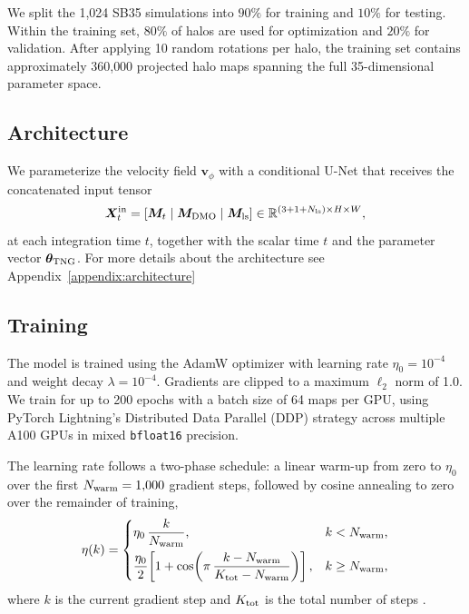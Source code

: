 \documentclass[linenumbers,trackchanges, twocolumn]{aastex701}
\begin{document}
We split the 1{,}024 SB35 simulations into $90\%$ for training and
$10\%$ for testing. Within the training set, $80\%$ of halos are used
for optimization and $20\%$ for validation. After applying 10 random
rotations per halo, the training set contains approximately
360{,}000 projected halo maps spanning the full 35-dimensional
parameter space.

\subsection{Architecture}
\label{subsec:architecture}

We parameterize the velocity field $\bm{v}_\phi$ with a conditional
U-Net \citep{ronneberger2015unet} that receives the concatenated input
tensor
\begin{equation}
    \bm{X}^{\rm in}_t
    = \left[\bm{M}_t \;\middle|\; \bm{M}_{\rm DMO}
             \;\middle|\; \bm{M}_{\rm ls}\right]
    \in \mathbb{R}^{(3+1+N_{\rm ls}) \times H \times W},
    \label{eq:model_input}
\end{equation}
at each integration time $t$, together with the scalar time $t$ and
the parameter vector $\boldsymbol{\theta}_{\rm TNG}$. For more details about the architecture see Appendix~\ref{appendix:architecture}


\subsection{Training}
\label{subsec:training}

The model is trained using the AdamW optimizer
\citep{loshchilov2019decoupled} with learning rate $\eta_0 = 10^{-4}$
and weight decay $\lambda = 10^{-4}$. Gradients are clipped to a
maximum $\ell_2$ norm of 1.0. We train for up to 200 epochs with a
batch size of 64 maps per GPU, using PyTorch Lightning's Distributed
Data Parallel (DDP) strategy across multiple A100 GPUs in mixed
\texttt{bfloat16} precision.

The learning rate follows a two-phase schedule: a linear warm-up from
zero to $\eta_0$ over the first $N_{\rm warm}=1{,}000$ gradient steps,
followed by cosine annealing to zero over the remainder of training,
\begin{equation}
    \eta(k) =
    \begin{cases}
        \eta_0\,\dfrac{k}{N_{\rm warm}},
            & k < N_{\rm warm}, \\[8pt]
        \dfrac{\eta_0}{2}
        \!\left[1 + \cos\!\left(
            \pi\,\dfrac{k - N_{\rm warm}}{K_{\rm tot} - N_{\rm warm}}
        \right)\right],
            & k \geq N_{\rm warm},
    \end{cases}
    \label{eq:lrsched}
\end{equation}
where $k$ is the current gradient step and $K_{\rm tot}$ is the total
number of steps \citep{loshchilov2017sgdr}.
\end{document}
